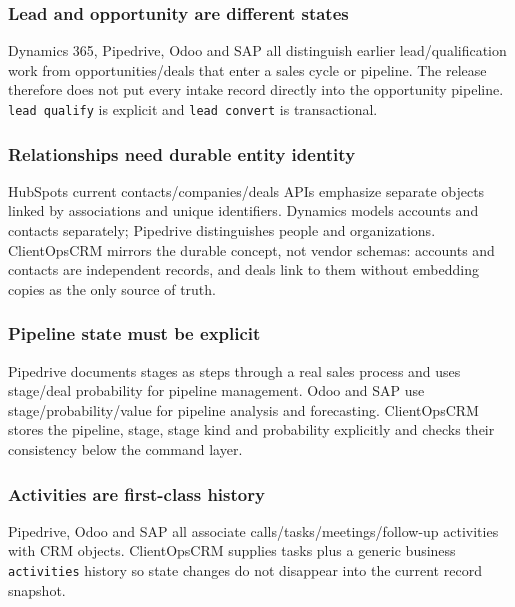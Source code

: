 \documentclass[
]{article}
\begin{document}
\subsubsection{Lead and opportunity are different
states}\label{lead-and-opportunity-are-different-states}

Dynamics 365, Pipedrive, Odoo and SAP all distinguish earlier
lead/qualification work from opportunities/deals that enter a sales
cycle or pipeline. The release therefore does not put every intake
record directly into the opportunity pipeline. \texttt{lead\ qualify} is
explicit and \texttt{lead\ convert} is transactional.

\subsubsection{Relationships need durable entity
identity}\label{relationships-need-durable-entity-identity}

HubSpot\textquotesingle s current contacts/companies/deals APIs
emphasize separate objects linked by associations and unique
identifiers. Dynamics models accounts and contacts separately; Pipedrive
distinguishes people and organizations. ClientOpsCRM mirrors the durable
concept, not vendor schemas: accounts and contacts are independent
records, and deals link to them without embedding copies as the only
source of truth.

\subsubsection{Pipeline state must be
explicit}\label{pipeline-state-must-be-explicit}

Pipedrive documents stages as steps through a real sales process and
uses stage/deal probability for pipeline management. Odoo and SAP use
stage/probability/value for pipeline analysis and forecasting.
ClientOpsCRM stores the pipeline, stage, stage kind and probability
explicitly and checks their consistency below the command layer.

\subsubsection{Activities are first-class
history}\label{activities-are-first-class-history}

Pipedrive, Odoo and SAP all associate calls/tasks/meetings/follow-up
activities with CRM objects. ClientOpsCRM supplies tasks plus a generic
business \texttt{activities} history so state changes do not disappear
into the current record snapshot.
\end{document}
